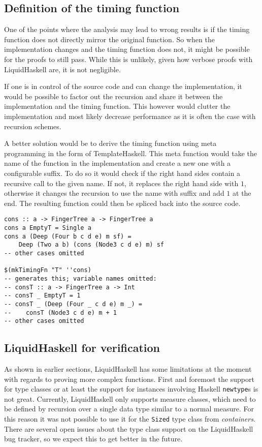\documentclass[sigplan,screen]{acmart}
\begin{document}
\subsection{Definition of the timing function}

One of the points where the analysis may lead to wrong results is if the timing function does not directly mirror the original function. So when the implementation changes and the timing function does not, it might be possible for the proofs to still pass. While this is unlikely, given how verbose proofs with LiquidHaskell are, it is not negligible.

If one is in control of the source code and can change the implementation, it would be possible to factor out the recursion and share it between the implementation and the timing function. This however would clutter the implementation and most likely decrease performance as it is often the case with recursion schemes.

A better solution would be to derive the timing function using meta programming in the form of TemplateHaskell. This meta function would take the name of the function in the implementation and create a new one with a configurable suffix. To do so it would check if the right hand sides contain a recursive call to the given name. If not, it replaces the right hand side with $1$, otherwise it changes the recursion to use the name with suffix and add $1$ at the end. The resulting function could then be spliced back into the source code.

\begin{lstlisting}
cons :: a -> FingerTree a -> FingerTree a
cons a EmptyT = Single a
cons a (Deep (Four b c d e) m sf) =
    Deep (Two a b) (cons (Node3 c d e) m) sf
-- other cases omitted

$(mkTimingFn "T" ''cons)
-- generates this; variable names omitted:
-- consT :: a -> FingerTree a -> Int
-- consT _ EmptyT = 1
-- consT _ (Deep (Four _ c d e) m _) =
--    consT (Node3 c d e) m + 1
-- other cases omitted
\end{lstlisting}

\subsection{LiquidHaskell for verification}

As shown in earlier sections, LiquidHaskell has some limitations at the moment with regards to proving more complex functions. First and foremost the support for type classes or at least the support for instances involving Haskell \texttt{newtype}s is not great. Currently, LiquidHaskell only supports measure classes, which need to be defined by recursion over a single data type similar to a normal measure. For this reason it was not possible to use it for the \texttt{Sized} type class from \textit{containers}. There are several open issues about the type class support on the LiquidHaskell bug tracker, so we expect this to get better in the future.
\end{document}
